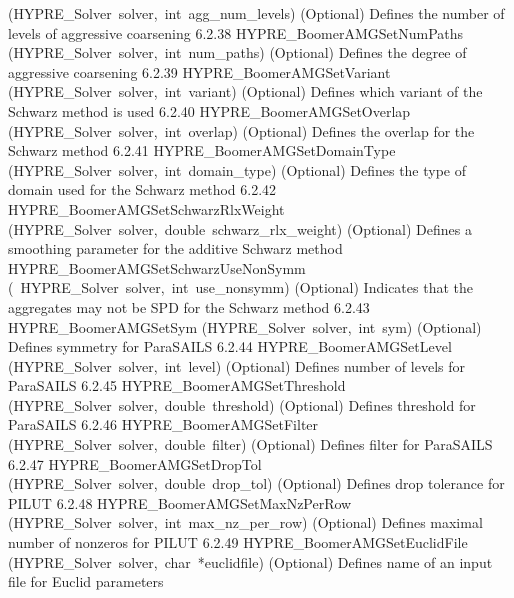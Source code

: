 \documentclass{article}
\begin{document}
\begin{cxxentry}
\begin{cxxentry}
\begin{cxxnames}
        {(HYPRE\_Solver\ solver,\ int\ agg\_num\_levels)}
        {
(Optional) Defines the number of levels of aggressive coarsening}
        {6.2.38}
        {HYPRE\_BoomerAMGSetNumPaths}
        {(HYPRE\_Solver\ solver,\ int\ num\_paths)}
        {
(Optional) Defines the degree of aggressive coarsening}
        {6.2.39}
        {HYPRE\_BoomerAMGSetVariant}
        {(HYPRE\_Solver\ solver,\ int\ variant)}
        {
(Optional) Defines which variant of the Schwarz method is used}
        {6.2.40}
        {HYPRE\_BoomerAMGSetOverlap}
        {(HYPRE\_Solver\ solver,\ int\ overlap)}
        {
(Optional) Defines the overlap for the Schwarz method}
        {6.2.41}
        {HYPRE\_BoomerAMGSetDomainType}
        {(HYPRE\_Solver\ solver,\ int\ domain\_type)}
        {
(Optional) Defines the type of domain used for the Schwarz method}
        {6.2.42}
        {HYPRE\_BoomerAMGSetSchwarzRlxWeight}
        {(HYPRE\_Solver\ solver,\ double\ schwarz\_rlx\_weight)}
        {
(Optional) Defines a smoothing parameter for the additive Schwarz method}
        {}
\label{cxx.6.2.64}
        {HYPRE\_BoomerAMGSetSchwarzUseNonSymm}
        {(\ HYPRE\_Solver\ solver,\ int\ use\_nonsymm)}
        {
(Optional) Indicates that the aggregates may not be SPD for the Schwarz method}
        {6.2.43}
        {HYPRE\_BoomerAMGSetSym}
        {(HYPRE\_Solver\ solver,\ int\ sym)}
        {
(Optional) Defines symmetry for ParaSAILS}
        {6.2.44}
        {HYPRE\_BoomerAMGSetLevel}
        {(HYPRE\_Solver\ solver,\ int\ level)}
        {
(Optional) Defines number of levels for ParaSAILS}
        {6.2.45}
        {HYPRE\_BoomerAMGSetThreshold}
        {(HYPRE\_Solver\ solver,\ double\ threshold)}
        {
(Optional) Defines threshold for ParaSAILS}
        {6.2.46}
        {HYPRE\_BoomerAMGSetFilter}
        {(HYPRE\_Solver\ solver,\ double\ filter)}
        {
(Optional) Defines filter for ParaSAILS}
        {6.2.47}
        {HYPRE\_BoomerAMGSetDropTol}
        {(HYPRE\_Solver\ solver,\ double\ drop\_tol)}
        {
(Optional) Defines drop tolerance for PILUT}
        {6.2.48}
        {HYPRE\_BoomerAMGSetMaxNzPerRow}
        {(HYPRE\_Solver\ solver,\ int\ max\_nz\_per\_row)}
        {
(Optional) Defines maximal number of nonzeros for PILUT}
        {6.2.49}
        {HYPRE\_BoomerAMGSetEuclidFile}
        {(HYPRE\_Solver\ solver,\ char\ *euclidfile)}
        {
(Optional) Defines name of an input file for Euclid parameters}

\end{cxxnames}
\end{cxxentry}
\end{cxxentry}
\end{document}
